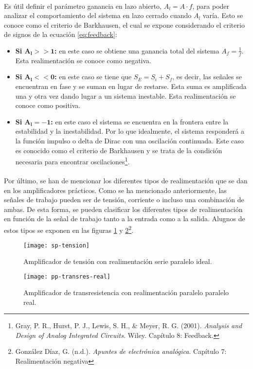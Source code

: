 \paragraph{}
Es útil definir el par\'ametro ganancia en lazo abierto, $A_l = A \cdot f$, para poder analizar el comportamiento del sistema en lazo cerrado cuando $A_l$ var\'ia. Esto se conoce como el criterio de Barkhausen, el cual se expone considerando el criterio de signos de la ecuaci\'on \ref{eq:feedback}:
\begin{itemize}
   \item \textbf{Si $\mathbf {A_l >> 1}$:} en este caso se obtiene una ganancia total del sistema $A_f = \frac{1}{f}$. Esta realimentación se conoce como negativa.
   \item \textbf{Si $\mathbf{A_l << 0}$:} en este caso se tiene que $S_E = S_i + S_f$, es decir, las señales se encuentran en fase y se suman en lugar de restarse. Esta suma es amplificada una y otra vez dando lugar a un sistema inestable. Esta realimentación se conoce como positiva.
   \item \textbf{Si $\mathbf{A_l = -1}$:} en este caso el sistema se encuentra en la frontera entre la estabilidad y la inestabilidad. Por lo que idealmente, el sistema responder\'a a la funci\'on impulso o delta de Dirac con una oscilaci\'on continuada. Este caso es conocido como el criterio de Barkhausen y se trata de la condici\'on necesaria para encontrar oscilaciones\footnote{Gray, P. R., Hurst, P. J., Lewis, S. H., \& Meyer, R. G. (2001). \textit{Analysis and Design of Analog Integrated Circuits}. Wiley. Capítulo 8: Feedback.}.
\end{itemize}
\paragraph{}
Por último, se han de mencionar los diferentes tipos de realimentación que se dan en los amplificadores prácticos. Como se ha mencionado anteriormente, las señales de trabajo pueden ser de tensión, corriente o incluso una combinación de ambas. De esta forma, se pueden clasificar los diferentes tipos de realimentación en función de la señal de trabajo tanto a la entrada como a la salida. Alugnos de estos tipos se exponen en las figuras \ref{fig:sp} y \ref{fig:pp}\footnote{González Díaz, G. (n.d.). \textit{Apuntes de electrónica analógica}. Cap\'itulo 7: Realimentaci\'on negativa}.
\begin{figure}[H]
    \centering
    \texttt{[image: sp-tension]}
    \caption{Amplificador de tensión con realimentaci\'on serie paralelo ideal.} 
    \label{fig:sp}
\end{figure}

\begin{figure}[H]
    \centering
    \texttt{[image: pp-transres-real]}
    \caption{Amplificador de transresistencia con realimentación paralelo paralelo real.} 
    \label{fig:pp}
\end{figure}
